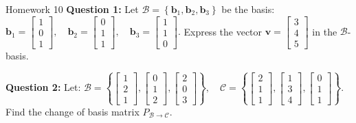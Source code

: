 \documentclass[10pt, aspectratio=169]{beamer}
\begin{document}
\begin{frame}{Homework 10}
\textbf{Question 1: }
Let \( {\mathcal{B}} = \left\{ \mathbf{b}_1, \mathbf{b}_2, \mathbf{b}_3 \right\} \) be the basis: 
\(
\mathbf{b}_1 = \begin{bmatrix} 1 \\ 0 \\ 1 \end{bmatrix}, \quad
\mathbf{b}_2 = \begin{bmatrix} 0 \\ 1 \\ 1 \end{bmatrix}, \quad
\mathbf{b}_3 = \begin{bmatrix} 1 \\ 1 \\ 0 \end{bmatrix}.
\)
Express the vector \( \mathbf{v} = \begin{bmatrix} 3 \\ 4 \\ 5 \end{bmatrix} \) in the \( {\mathcal{B}} \)-basis.

\vspace{.25cm}

\textbf{Question 2:}
Let:
\(
{\mathcal{B}} = \left\{ \begin{bmatrix} 1 \\ 2 \\ 1 \end{bmatrix}, \begin{bmatrix} 0 \\ 1 \\ 2 \end{bmatrix}, \begin{bmatrix} 2 \\ 0 \\ 3 \end{bmatrix} \right\}, \quad
{\mathcal{C}} = \left\{ \begin{bmatrix} 2 \\ 1 \\ 1 \end{bmatrix}, \begin{bmatrix} 1 \\ 3 \\ 4 \end{bmatrix}, \begin{bmatrix} 0 \\ 1 \\ 1 \end{bmatrix} \right\}.
\)
Find the change of basis matrix \( P_{{\mathcal{B}} \to {\mathcal{C}}} \).


\end{frame}
\end{document}
